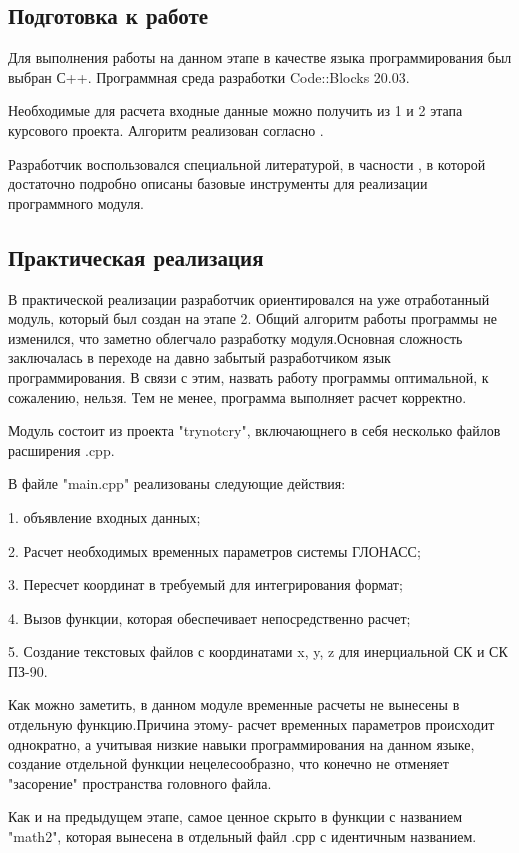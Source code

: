 \documentclass[]{article}
\begin{document}
\subsection{Подготовка к работе}
Для выполнения работы на данном этапе в качестве языка программирования был выбран С++. Программная среда разработки Code::Blocks 20.03. 

Необходимые для расчета входные данные можно получить из 1 и 2 этапа курсового проекта. Алгоритм реализован согласно \cite{ICD}. 

Разработчик воспользовался специальной литературой, в часности \cite{alex}, в которой достаточно подробно описаны базовые инструменты для реализации программного модуля. 
\subsection{Практическая реализация}

В практической реализации разработчик ориентировался на уже отработанный модуль, который был создан на этапе 2. Общий алгоритм работы программы не изменился, что заметно облегчало разработку модуля.Основная сложность заключалась в переходе на давно забытый разработчиком язык программирования. В связи с этим, назвать работу программы оптимальной, к сожалению, нельзя. Тем не менее, программа выполняет расчет корректно.

Модуль состоит из проекта "trynotcry", включающнего в себя несколько файлов расширения .cpp.

В файле "main.cpp" реализованы следующие действия:

1. объявление входных данных;

2. Расчет необходимых временных параметров системы ГЛОНАСС;

3. Пересчет координат в требуемый для интегрирования формат;

4. Вызов функции, которая обеспечивает непосредственно  расчет;

5. Создание текстовых файлов с координатами x, y, z для инерциальной СК и СК ПЗ-90.

Как  можно заметить, в данном модуле временные расчеты не вынесены в отдельную функцию.Причина этому- расчет временных параметров происходит однократно, а учитывая низкие навыки программирования на данном языке, создание отдельной функции нецелесообразно, что конечно не отменяет "засорение" пространства головного файла.

Как и на предыдущем этапе, самое ценное скрыто в функции с названием "math2", которая вынесена в отдельный файл .срр с идентичным названием. 
\end{document}
